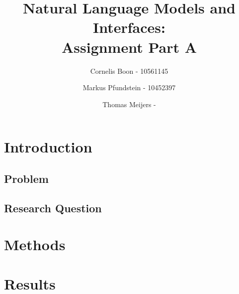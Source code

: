 \documentclass[final,12pt]{elsarticle}
\begin{document}
\begin{frontmatter}
\title{Natural Language Models and Interfaces: \\ Assignment Part A}
\author{Cornelis Boon - 10561145} 
\author{Markus Pfundstein - 10452397}
\author{Thomas Meijers - %
}
\begin{abstract}
\end{abstract}
\end{frontmatter}
\newpage

\section{Introduction}
\subsection{Problem}

\subsection{Research Question}
\section{Methods}
\section{Results}
\end{document}
